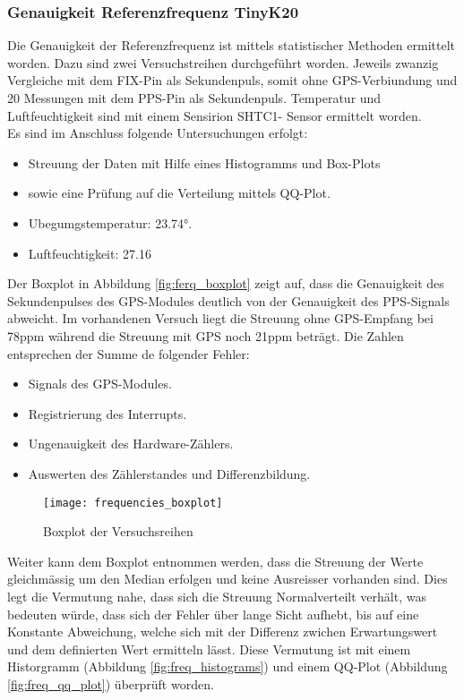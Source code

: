 \subsubsection{Genauigkeit Referenzfrequenz TinyK20}
Die Genauigkeit der Referenzfrequenz ist mittels statistischer Methoden ermittelt worden. Dazu sind zwei Versuchstreihen durchgeführt worden. Jeweils zwanzig Vergleiche mit dem FIX-Pin als Sekundenpuls, somit ohne GPS-Verbiundung und 20 Messungen mit dem PPS-Pin als Sekundenpuls. Temperatur und Luftfeuchtigkeit sind mit einem Sensirion SHTC1- Sensor ermittelt worden.\\
Es sind im Anschluss folgende Untersuchungen erfolgt:
\begin{itemize}
	\item Streuung der Daten mit Hilfe eines Histogramms und Box-Plots
	\item sowie eine Prüfung auf die Verteilung mittels QQ-Plot.
	\item Ubegumgstemperatur: 23.74°.
	\item Luftfeuchtigkeit: 27.16%
\end{itemize}
Der Boxplot in Abbildung \ref{fig:ferq_boxplot} zeigt auf, dass die Genauigkeit des Sekundenpulses des GPS-Modules deutlich von der Genauigkeit des PPS-Signals abweicht. Im vorhandenen Versuch liegt die Streuung ohne GPS-Empfang bei 78ppm während die Streuung mit GPS noch 21ppm beträgt. Die Zahlen entsprechen der Summe de folgender Fehler:
\begin{itemize}
	\item Signals des GPS-Modules.
	\item Registrierung des Interrupts.
	\item Ungenauigkeit des Hardware-Zählers.
	\item Auswerten des Zählerstandes und Differenzbildung. 
\end{itemize}
	\begin{figure}[H]
		\centering
		\texttt{[image: frequencies\_boxplot]}
		\caption{Boxplot der Versuchsreihen}
		\label{fig:freq_boxplot}
	\end{figure}
%
Weiter kann dem Boxplot entnommen werden, dass die Streuung der Werte gleichmässig um den Median erfolgen und keine Ausreisser vorhanden sind. Dies legt die Vermutung nahe, dass sich die Streuung Normalverteilt verhält, was bedeuten würde, dass sich der Fehler über lange Sicht aufhebt, bis auf eine Konstante Abweichung, welche sich mit der Differenz zwichen Erwartungswert und dem definierten Wert ermitteln lässt. Diese Vermutung ist mit einem Historgramm (Abbildung \ref{fig:freq_histograms}) und einem QQ-Plot (Abbildung \ref{fig:freq_qq_plot}) überprüft worden.
